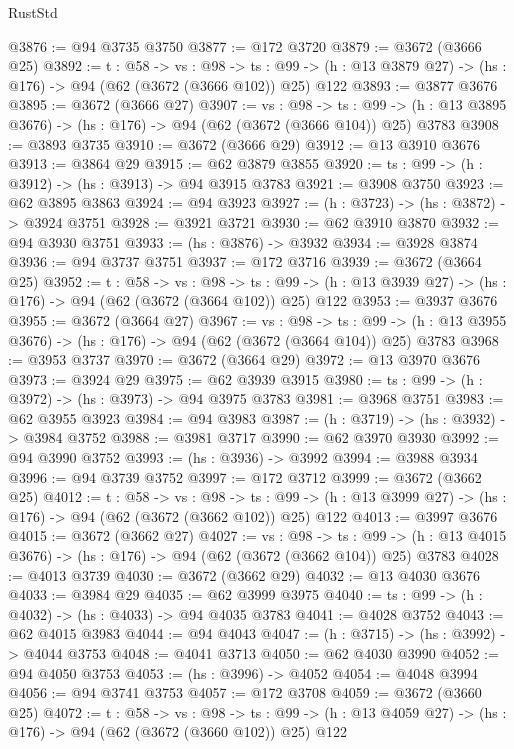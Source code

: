 \begin{lexlean}{RustStd}
\begin{coremodule}
@3876 := @94 @3735 @3750
@3877 := @172 @3720
@3879 := @3672 (@3666 @25)
@3892 := {t : @58} ->
  {vs : @98} ->
  {ts : @99} -> (h : @13 @3879 @27) -> (hs : @176) -> @94 (@62 (@3672 (@3666 @102)) @25) @122
@3893 := @3877 @3676
@3895 := @3672 (@3666 @27)
@3907 := {vs : @98} ->
  {ts : @99} -> (h : @13 @3895 @3676) -> (hs : @176) -> @94 (@62 (@3672 (@3666 @104)) @25) @3783
@3908 := @3893 @3735
@3910 := @3672 (@3666 @29)
@3912 := @13 @3910 @3676
@3913 := @3864 @29
@3915 := @62 @3879 @3855
@3920 := {ts : @99} -> (h : @3912) -> (hs : @3913) -> @94 @3915 @3783
@3921 := @3908 @3750
@3923 := @62 @3895 @3863
@3924 := @94 @3923
@3927 := (h : @3723) -> (hs : @3872) -> @3924 @3751
@3928 := @3921 @3721
@3930 := @62 @3910 @3870
@3932 := @94 @3930 @3751
@3933 := (hs : @3876) -> @3932
@3934 := @3928 @3874
@3936 := @94 @3737 @3751
@3937 := @172 @3716
@3939 := @3672 (@3664 @25)
@3952 := {t : @58} ->
  {vs : @98} ->
  {ts : @99} -> (h : @13 @3939 @27) -> (hs : @176) -> @94 (@62 (@3672 (@3664 @102)) @25) @122
@3953 := @3937 @3676
@3955 := @3672 (@3664 @27)
@3967 := {vs : @98} ->
  {ts : @99} -> (h : @13 @3955 @3676) -> (hs : @176) -> @94 (@62 (@3672 (@3664 @104)) @25) @3783
@3968 := @3953 @3737
@3970 := @3672 (@3664 @29)
@3972 := @13 @3970 @3676
@3973 := @3924 @29
@3975 := @62 @3939 @3915
@3980 := {ts : @99} -> (h : @3972) -> (hs : @3973) -> @94 @3975 @3783
@3981 := @3968 @3751
@3983 := @62 @3955 @3923
@3984 := @94 @3983
@3987 := (h : @3719) -> (hs : @3932) -> @3984 @3752
@3988 := @3981 @3717
@3990 := @62 @3970 @3930
@3992 := @94 @3990 @3752
@3993 := (hs : @3936) -> @3992
@3994 := @3988 @3934
@3996 := @94 @3739 @3752
@3997 := @172 @3712
@3999 := @3672 (@3662 @25)
@4012 := {t : @58} ->
  {vs : @98} ->
  {ts : @99} -> (h : @13 @3999 @27) -> (hs : @176) -> @94 (@62 (@3672 (@3662 @102)) @25) @122
@4013 := @3997 @3676
@4015 := @3672 (@3662 @27)
@4027 := {vs : @98} ->
  {ts : @99} -> (h : @13 @4015 @3676) -> (hs : @176) -> @94 (@62 (@3672 (@3662 @104)) @25) @3783
@4028 := @4013 @3739
@4030 := @3672 (@3662 @29)
@4032 := @13 @4030 @3676
@4033 := @3984 @29
@4035 := @62 @3999 @3975
@4040 := {ts : @99} -> (h : @4032) -> (hs : @4033) -> @94 @4035 @3783
@4041 := @4028 @3752
@4043 := @62 @4015 @3983
@4044 := @94 @4043
@4047 := (h : @3715) -> (hs : @3992) -> @4044 @3753
@4048 := @4041 @3713
@4050 := @62 @4030 @3990
@4052 := @94 @4050 @3753
@4053 := (hs : @3996) -> @4052
@4054 := @4048 @3994
@4056 := @94 @3741 @3753
@4057 := @172 @3708
@4059 := @3672 (@3660 @25)
@4072 := {t : @58} ->
  {vs : @98} ->
  {ts : @99} -> (h : @13 @4059 @27) -> (hs : @176) -> @94 (@62 (@3672 (@3660 @102)) @25) @122

\end{coremodule}
\end{lexlean}
